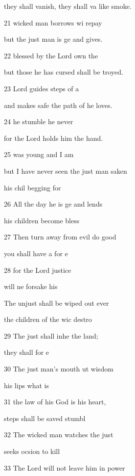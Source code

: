 they shall vanish, they shall va like smoke. 

21  wicked man borrows wi repay 

but the just man is ge and gives. 

22  blessed by the Lord  own the  

but those he has cursed shall be troyed. 

23  Lord guides  steps of a  

and makes safe the path of  he loves. 

24  he stumble he  never  

for the Lord holds him  the hand. 

25  was young and  I am  

but I have never seen the just man saken 

 his chil begging for  

26 All the day he is ge and lends 

 his children become  bless 

27 Then turn away from evil  do good 

 you shall have a  for e 

28 for the Lord  justice 

 will ne forsake his  

The unjust shall be wiped out  ever 

 the children of the wic destro 

29 The just shall inhe the land; 

 they shall  for e 

30 The just man's mouth ut wisdom 

 his lips  what is  

31 the law of his God is  his heart, 

 steps shall be saved  stumbl 

32 The wicked man watches  the just 

 seeks ocsion to kill  

33 The Lord will not leave him in  power 

